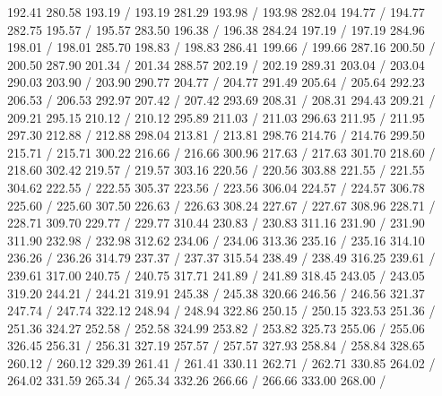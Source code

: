 { 192.41 280.58 193.19 /
 193.19 281.29 193.98 /
 193.98 282.04 194.77 /
 194.77 282.75 195.57 /
 195.57 283.50 196.38 /
 196.38 284.24 197.19 /
 197.19 284.96 198.01 /
 198.01 285.70 198.83 /
 198.83 286.41 199.66 /
 199.66 287.16 200.50 /
 200.50 287.90 201.34 /
 201.34 288.57 202.19 /
 202.19 289.31 203.04 /
 203.04 290.03 203.90 /
 203.90 290.77 204.77 /
 204.77 291.49 205.64 /
 205.64 292.23 206.53 /
 206.53 292.97 207.42 /
 207.42 293.69 208.31 /
 208.31 294.43 209.21 /
 209.21 295.15 210.12 /
 210.12 295.89 211.03 /
 211.03 296.63 211.95 /
 211.95 297.30 212.88 /
 212.88 298.04 213.81 /
 213.81 298.76 214.76 /
 214.76 299.50 215.71 /
 215.71 300.22 216.66 /
 216.66 300.96 217.63 /
 217.63 301.70 218.60 /
 218.60 302.42 219.57 /
 219.57 303.16 220.56 /
 220.56 303.88 221.55 /
 221.55 304.62 222.55 /
 222.55 305.37 223.56 /
 223.56 306.04 224.57 /
 224.57 306.78 225.60 /
 225.60 307.50 226.63 /
 226.63 308.24 227.67 /
 227.67 308.96 228.71 /
 228.71 309.70 229.77 /
 229.77 310.44 230.83 /
 230.83 311.16 231.90 /
 231.90 311.90 232.98 /
 232.98 312.62 234.06 /
 234.06 313.36 235.16 /
 235.16 314.10 236.26 /
 236.26 314.79 237.37 /
 237.37 315.54 238.49 /
 238.49 316.25 239.61 /
 239.61 317.00 240.75 /
 240.75 317.71 241.89 /
 241.89 318.45 243.05 /
 243.05 319.20 244.21 /
 244.21 319.91 245.38 /
 245.38 320.66 246.56 /
 246.56 321.37 247.74 /
 247.74 322.12 248.94 /
 248.94 322.86 250.15 /
 250.15 323.53 251.36 /
 251.36 324.27 252.58 /
 252.58 324.99 253.82 /
 253.82 325.73 255.06 /
 255.06 326.45 256.31 /
 256.31 327.19 257.57 /
 257.57 327.93 258.84 /
 258.84 328.65 260.12 /
 260.12 329.39 261.41 /
 261.41 330.11 262.71 /
 262.71 330.85 264.02 /
 264.02 331.59 265.34 /
 265.34 332.26 266.66 /
 266.66 333.00 268.00 /
}

